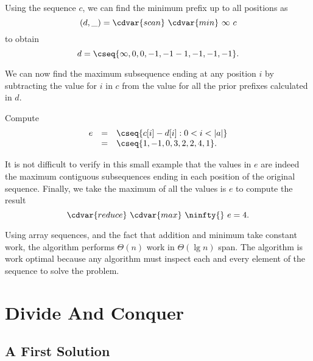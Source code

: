\begin{flex}
\begin{example}

Using the sequence $c$, we can find the minimum prefix up to all
positions as
\[
(d,\_) = \cdvar{scan}~\cdvar{min}~\infty~c
\]
to obtain
\[
d = \cseq{\infty, 0, 0, -1, -1 -1, -1, -1, -1}.
\]

We can now find the maximum subsequence ending at any position $i$ by
subtracting the value for $i$ in $c$ from the value for all the prior
prefixes calculated in $d$.
%

Compute
\[
\begin{array}{lcl}
e & = & \cseq{c[i]-d[i]: 0 < i < |a|} 
\\
  & = & \cseq{1, -1, 0, 3, 2, 2, 4, 1}.
\end{array}
\]

It is not difficult to verify in this small example that the values in
$e$ are indeed the maximum contiguous subsequences ending in each
position of the original sequence.  Finally, we take the maximum of
all the values is $e$ to compute the result
\[
\cdvar{reduce}~\cdvar{max}~\ninfty{}~e = 4.
\]

\end{example}
\end{flex}

\begin{gram}

Using array sequences, and the fact that addition and minimum take
constant work, the algorithm performs $\Theta(n)$ work in $\Theta(\lg
n)$ span.  
%
The algorithm is work optimal because any algorithm must inspect each
and every element of the sequence to solve the \MCSS{} problem.
\end{gram}

\section{Divide And Conquer}
\label{sec:mcss::dc}

\subsection{A First Solution}
\label{sec:mcss::dc::first}

